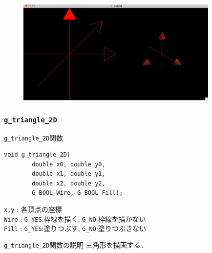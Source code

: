 \documentclass[platex,a4paper,12pt]{jsarticle}%
\begin{document}
\begin{figure}[htb]
\centering
	\includegraphics[width=100mm]{./Figures/eps/Canvas_g_arrow2.eps}
\end{figure}




\clearpage
\subsubsection{\texttt{g\_triangle\_2D}}

\begin{itembox}[l]{\texttt{g\_triangle\_2D}関数}
\begin{verbatim}
void g_triangle_2D(        
        double x0, double y0,
        double x1, double y1,
        double x2, double y2,
        G_BOOL Wire, G_BOOL Fill);
\end{verbatim}
\verb|x,y| ; 各頂点の座標\\
\verb|Wire| ; \verb|G_YES|:枠線を描く, \verb|G_NO|:枠線を描かない \\
\verb|Fill| ; \verb|G_YES|:塗りつぶす, \verb|G_NO|:塗りつぶさない 
\end{itembox}

\begin{itembox}[l]{\texttt{g\_triangle\_2D}関数の説明}
三角形を描画する．
\end{itembox}

\begin{figure}[htb]
\end{figure}
\end{document}
